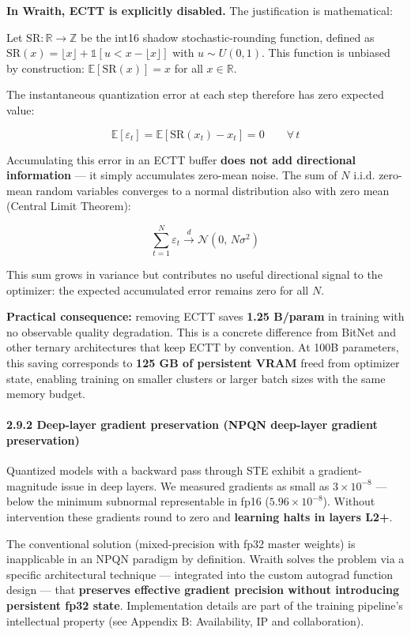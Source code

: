 \textbf{In Wraith, ECTT is explicitly disabled.} The justification is
mathematical:

Let \(\mathrm{SR}: \mathbb{R} \to \mathbb{Z}\) be the int16 shadow
stochastic-rounding function, defined as
\(\mathrm{SR}(x) = \lfloor x \rfloor + \mathbb{1}[u < x - \lfloor x \rfloor]\)
with \(u \sim U(0, 1)\). This function is unbiased by construction:
\(\mathbb{E}[\mathrm{SR}(x)] = x\) for all \(x \in \mathbb{R}\).

The instantaneous quantization error at each step therefore has zero
expected value:

\[
\mathbb{E}[\varepsilon_t] = \mathbb{E}[\mathrm{SR}(x_t) - x_t] = 0 \qquad \forall\, t
\]

Accumulating this error in an ECTT buffer \textbf{does not add
directional information} --- it simply accumulates zero-mean noise. The
sum of \(N\) i.i.d. zero-mean random variables converges to a normal
distribution also with zero mean (Central Limit Theorem):

\[
\sum_{t=1}^{N} \varepsilon_t \xrightarrow{d} \mathcal{N}(0,\, N\sigma^2)
\]

This sum grows in variance but contributes no useful directional signal
to the optimizer: the expected accumulated error remains zero for all
\(N\).

\textbf{Practical consequence:} removing ECTT saves \textbf{1.25
B/param} in training with no observable quality degradation. This is a
concrete difference from BitNet and other ternary architectures that
keep ECTT by convention. At 100B parameters, this saving corresponds to
\textbf{125 GB of persistent VRAM} freed from optimizer state, enabling
training on smaller clusters or larger batch sizes with the same memory
budget.

\paragraph{2.9.2 Deep-layer gradient preservation (NPQN deep-layer
gradient
preservation)}\label{deep-layer-gradient-preservation-npqn-deep-layer-gradient-preservation}

Quantized models with a backward pass through STE exhibit a
gradient-magnitude issue in deep layers. We measured gradients as small
as \(3 \times 10^{-8}\) --- below the minimum subnormal representable in
fp16 (\(5.96 \times 10^{-8}\)). Without intervention these gradients
round to zero and \textbf{learning halts in layers L2+}.

The conventional solution (mixed-precision with fp32 master weights) is
inapplicable in an NPQN paradigm by definition. Wraith solves the
problem via a specific architectural technique --- integrated into the
custom autograd function design --- that \textbf{preserves effective
gradient precision without introducing persistent fp32 state}.
Implementation details are part of the training pipeline's intellectual
property (see Appendix B: Availability, IP and collaboration).

